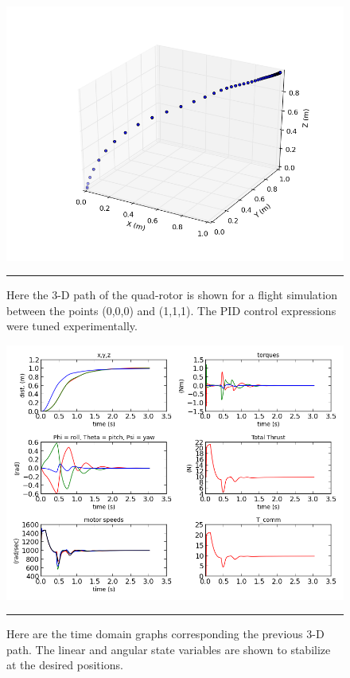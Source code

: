\begin{figure}[htbp]
	\centering
		\includegraphics[scale = 0.5]{Figures/typical_run_time_3D_path.png}
		\rule{35em}{0.5pt}
	\caption[Typical Run 3D Path]{Here the 3-D path of the quad-rotor is shown for a flight simulation between the points (0,0,0) and (1,1,1). The PID control expressions were tuned experimentally.}
	\label{fig:Typical Run 3D Path}
\end{figure}

\begin{figure}[htbp]
	\centering
		\includegraphics[scale = 0.5]{Figures/typical_run_time_domain.png}
		\rule{35em}{0.5pt}
	\caption[Typical Run Time Domain]{Here are the time domain graphs corresponding the previous 3-D path. The linear and angular state variables are shown to stabilize at the desired positions. }
	\label{fig:Typical Run Time Domain}
\end{figure}


